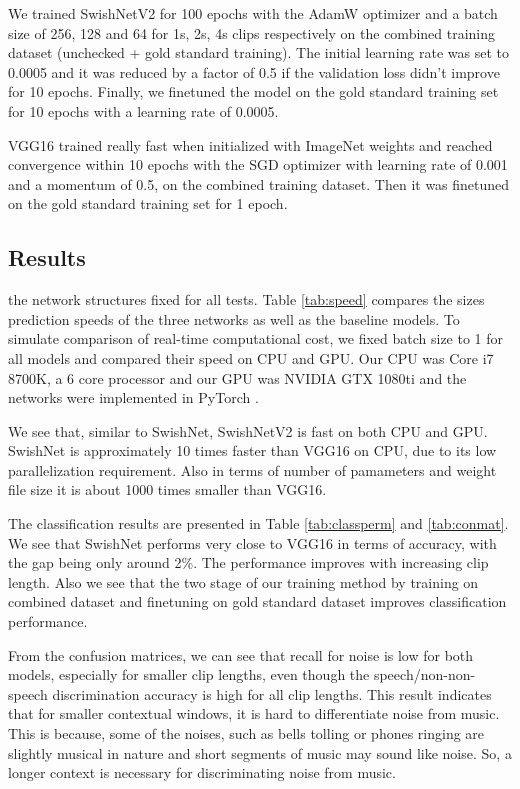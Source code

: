 \documentclass{article}
\begin{document}
We trained SwishNetV2 for 100 epochs with the AdamW optimizer \cite{loshchilov2017decoupled} and a batch size of 256, 128 and 64 for 1s, 2s, 4s clips respectively on the combined training dataset (unchecked + gold standard training). The initial learning rate was set to 0.0005 and it was reduced by a factor of 0.5 if the validation loss didn't improve for 10 epochs. Finally, we finetuned the model on the gold standard training set for 10 epochs with a learning rate of 0.0005.

VGG16 trained really fast when initialized with ImageNet weights and reached convergence within 10 epochs with the SGD optimizer with learning rate of 0.001 and a momentum of 0.5, on the combined training dataset. Then it was finetuned on the gold standard training set for 1 epoch.

\subsection{Results}




the network structures fixed for all tests. Table \ref{tab:speed} compares the sizes prediction speeds of the three networks as well as the baseline models. To simulate comparison of real-time computational cost, we fixed batch size to 1 for all models and compared their speed on CPU and GPU. Our CPU was Core i7 8700K, a 6 core processor and our GPU was NVIDIA GTX 1080ti and the networks were implemented in PyTorch \cite{paszke2019pytorch}.

We see that, similar to SwishNet, SwishNetV2 is fast on both CPU and GPU. SwishNet is approximately 10 times faster than VGG16 on CPU, due to its low parallelization requirement. Also in terms of number of pamameters and weight file size it is about 1000 times smaller than VGG16.

The classification results are presented in Table \ref{tab:classperm} and \ref{tab:conmat}. We see that SwishNet performs very close to VGG16 in terms of accuracy, with the gap being only around 2\%. The performance improves with increasing clip length. Also we see that the two stage of our training method by training on combined dataset and finetuning on gold standard dataset improves classification performance.

From the confusion matrices, we can see that recall for noise is low for both models, especially for smaller clip lengths, even though the speech/non-non-speech discrimination accuracy is high for all clip lengths. This result indicates that for smaller contextual windows, it is hard to differentiate noise from music. This is because, some of the noises, such as bells tolling or phones ringing are slightly musical in nature and short segments of music may sound like noise. So, a longer context is necessary for discriminating noise from music.
\end{document}
